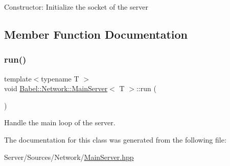 Constructor\+: Initialize the socket of the server 

\subsection{Member Function Documentation}
\mbox{\label{classBabel_1_1Network_1_1MainServer_a177ad77cca5acf93a383d99ad2600e13}} 
\subsubsection{\texorpdfstring{run()}{run()}}
{\footnotesize\ttfamily template$<$typename T $>$ \\
void \hyperlink{classBabel_1_1Network_1_1MainServer}{Babel\+::\+Network\+::\+Main\+Server}$<$ T $>$\+::run (\begin{DoxyParamCaption}{ }\end{DoxyParamCaption})\hspace{0.3cm}{\ttfamily [inline]}}

Handle the main loop of the server. 

The documentation for this class was generated from the following file\+:\begin{DoxyCompactItemize}
\item 
Server/\+Sources/\+Network/\hyperlink{MainServer_8hpp}{Main\+Server.\+hpp}\end{DoxyCompactItemize}
